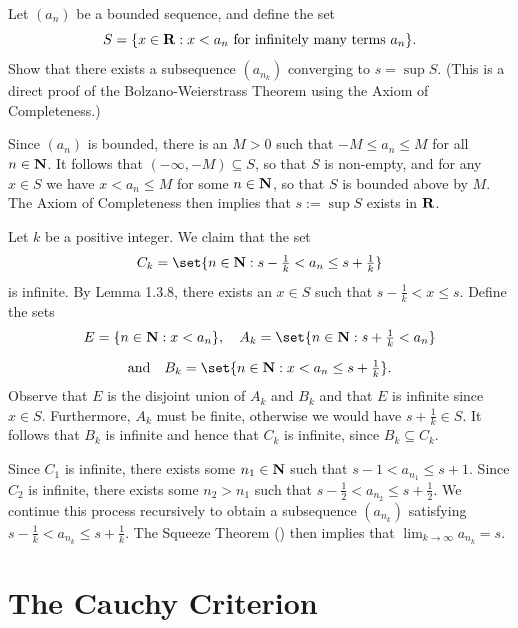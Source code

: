\documentclass{lew98_solutions}
\begin{document}
\begin{exercise}
\label{ex:2.5.9}
    Let \( (a_n) \) be a bounded sequence, and define the set
    \[
        S = \{ x \in \mathbf{R} : x < a_n \text{ for infinitely many terms } a_n \}.
    \]
    Show that there exists a subsequence \( (a_{n_k}) \) converging to \( s = \sup S \). (This is a direct proof of the Bolzano-Weierstrass Theorem using the Axiom of Completeness.)
\end{exercise}

\begin{solution}
    Since \( (a_n) \) is bounded, there is an \( M > 0 \) such that \( -M \leq a_n \leq M \) for all \( n \in \mathbf{N} \). It follows that \( (-\infty, -M) \subseteq S \), so that \( S \) is non-empty, and for any \( x \in S \) we have \( x < a_n \leq M \) for some \( n \in \mathbf{N} \), so that \( S \) is bounded above by \( M \). The Axiom of Completeness then implies that \( s := \sup S \) exists in \( \mathbf{R} \).

    Let \( k \) be a positive integer. We claim that the set
    \[
        C_k = \set{ n \in \N : s - \tfrac{1}{k} < a_n \leq s + \tfrac{1}{k} }
    \]
    is infinite. By Lemma 1.3.8, there exists an \( x \in S \) such that \( s - \tfrac{1}{k} < x \leq s \). Define the sets
    \begin{multline*}
        E = \{ n \in \N : x < a_n \}, \quad A_k = \set{ n \in \N : s + \tfrac{1}{k} < a_n } \\[2mm]
        \text{and} \quad B_k = \set{ n \in \N : x < a_n \leq s + \tfrac{1}{k} }.
    \end{multline*}
    Observe that \( E \) is the disjoint union of \( A_k \) and \( B_k \) and that \( E \) is infinite since \( x \in S \). Furthermore, \( A_k \) must be finite, otherwise we would have \( s + \tfrac{1}{k} \in S \). It follows that \( B_k \) is infinite and hence that \( C_k \) is infinite, since \( B_k \subseteq C_k \).

    Since \( C_1 \) is infinite, there exists some \( n_1 \in \mathbf{N} \) such that \( s - 1 < a_{n_1} \leq s + 1 \). Since \( C_2 \) is infinite, there exists some \( n_2 > n_1 \) such that \( s - \tfrac{1}{2} < a_{n_2} \leq s + \tfrac{1}{2} \). We continue this process recursively to obtain a subsequence \( (a_{n_k}) \) satisfying \( s - \tfrac{1}{k} < a_{n_k} \leq s + \tfrac{1}{k} \). The Squeeze Theorem () then implies that \( \lim_{k \to \infty} a_{n_k} = s \).
\end{solution}

\section{The Cauchy Criterion}
\label{sec:2.6}
\end{document}
